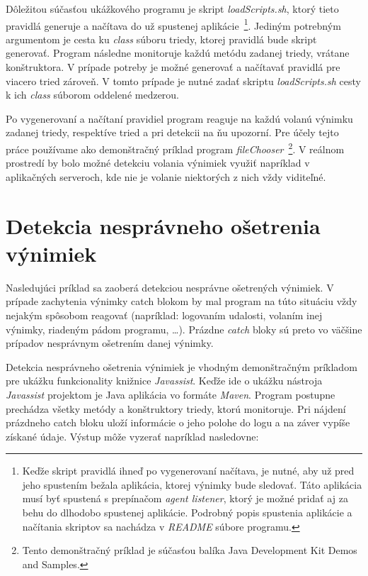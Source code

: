 \documentclass[11pt,final,oneside]{fithesis}
\begin{document}
Dôležitou súčasťou ukážkového programu je skript \textit{loadScripts.sh}, ktorý
tieto pravidlá generuje a načítava do už spustenej aplikácie~\footnote{Keďže 
skript pravidlá ihneď po vygenerovaní načítava, je nutné, aby už pred jeho 
spustením bežala aplikácia, ktorej výnimky bude sledovať. Táto aplikácia musí 
byť spustená s prepínačom \textit{agent listener}, ktorý je možné pridať aj za 
behu do dlhodobo spustenej aplikácie. Podrobný popis spustenia aplikácie a 
načítania skriptov sa nachádza v \textit{README} súbore programu.}. Jediným 
potrebným argumentom je cesta ku \textit{class} súboru triedy, ktorej pravidlá 
bude skript generovať. Program následne monitoruje každú metódu zadanej triedy,
vrátane konštruktora. V prípade potreby je možné generovať a načítavať pravidlá
pre viacero tried zároveň. V tomto prípade je nutné zadať skriptu 
\textit{loadScripts.sh} cesty k ich \textit{class} súborom oddelené medzerou.

Po vygenerovaní a načítaní pravidiel program reaguje na každú volanú výnimku 
zadanej triedy, respektíve tried a pri detekcii na ňu upozorní. Pre účely tejto
práce používame ako demonštračný príklad program 
\textit{fileChooser}~\footnote{Tento demonštračný príklad je súčasťou balíka 
Java Development Kit Demos and Samples.}. V reálnom prostredí by bolo možné 
detekciu volania výnimiek využiť napríklad v aplikačných serveroch, kde nie je 
volanie niektorých z nich vždy viditeľné.

\section{Detekcia nesprávneho ošetrenia výnimiek}
Nasledujúci príklad sa zaoberá detekciou nesprávne ošetrených výnimiek. V 
prípade zachytenia výnimky catch blokom by mal program na túto situáciu vždy 
nejakým spôsobom reagovať (napríklad: logovaním udalosti, volaním inej výnimky,
riadeným pádom programu, …). Prázdne \textit{catch} bloky sú preto vo väčšine 
prípadov nesprávnym ošetrením danej výnimky.

Detekcia nesprávneho ošetrenia výnimiek je vhodným demonštračným príkladom pre 
ukážku funkcionality knižnice \textit{Javassist}. Keďže ide o ukážku nástroja
\textit{Javassist} projektom je Java aplikácia vo formáte \textit{Maven}. 
Program postupne prechádza všetky metódy a konštruktory triedy, ktorú
monitoruje. Pri nájdení prázdneho catch bloku uloží informácie o jeho polohe
do logu a na záver vypíše získané údaje. Výstup môže vyzerať napríklad
nasledovne:
\end{document}
